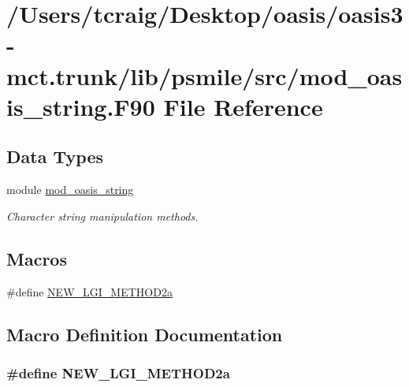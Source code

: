 \hypertarget{mod__oasis__string_8_f90}{\section{/\+Users/tcraig/\+Desktop/oasis/oasis3-\/mct.trunk/lib/psmile/src/mod\+\_\+oasis\+\_\+string.F90 File Reference}
\label{mod__oasis__string_8_f90}
}
\subsection*{Data Types}
\begin{DoxyCompactItemize}
\item 
module \hyperlink{classmod__oasis__string}{mod\+\_\+oasis\+\_\+string}
\begin{DoxyCompactList}\small\item\em Character string manipulation methods. \end{DoxyCompactList}\end{DoxyCompactItemize}
\subsection*{Macros}
\begin{DoxyCompactItemize}
\item 
\#define \hyperlink{mod__oasis__string_8_f90_a732dc6b61280242f5cf9c6b817dfd452}{N\+E\+W\+\_\+\+L\+G\+I\+\_\+\+M\+E\+T\+H\+O\+D2a}
\end{DoxyCompactItemize}


\subsection{Macro Definition Documentation}
\hypertarget{mod__oasis__string_8_f90_a732dc6b61280242f5cf9c6b817dfd452}{
\subsubsection[{N\+E\+W\+\_\+\+L\+G\+I\+\_\+\+M\+E\+T\+H\+O\+D2a}]{\setlength{\rightskip}{0pt plus 5cm}\#define N\+E\+W\+\_\+\+L\+G\+I\+\_\+\+M\+E\+T\+H\+O\+D2a}}\label{mod__oasis__string_8_f90_a732dc6b61280242f5cf9c6b817dfd452}
